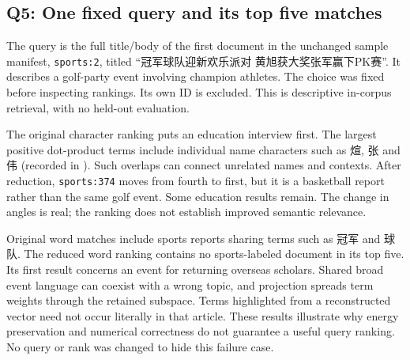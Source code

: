 \subsection{Q5: One fixed query and its top five matches}
The query is the full title/body of the first document in the unchanged
sample manifest, \texttt{sports:2}, titled
“冠军球队迎新欢乐派对 黄旭获大奖张军赢下PK赛”.
It describes a golf-party event involving champion athletes.
The choice was fixed before inspecting rankings. Its own ID is excluded.
This is descriptive in-corpus retrieval, with no held-out evaluation.


The original character ranking puts an education interview first.
The largest positive dot-product terms include individual name characters
such as 煊, 张 and 伟 (recorded in ).
Such overlaps can connect unrelated names and contexts.
After reduction, \texttt{sports:374} moves from fourth to first, but it
is a basketball report rather than the same golf event.
Some education results remain. The change in angles is real;
the ranking does not establish improved semantic relevance.


Original word matches include sports reports sharing terms such as
冠军 and 球队. The reduced word ranking contains no sports-labeled
document in its top five. Its first result concerns an event for returning
overseas scholars. Shared broad event language can coexist with a wrong
topic, and projection spreads term weights through the retained subspace.
Terms highlighted from a reconstructed vector need not occur literally
in that article. These results illustrate why energy preservation and
numerical correctness do not guarantee a useful query ranking.
No query or rank was changed to hide this failure case.
